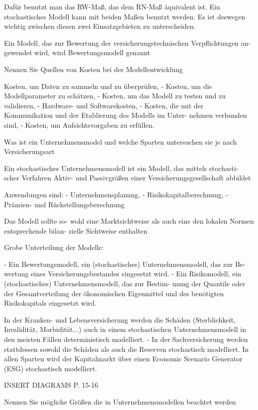 Dafür benutzt man das RW-Maß, das dem RN-Maß
äquivalent ist. Ein stochastisches Modell kann mit beiden Maßen benutzt werden.
Es ist deswegen wichtig zwischen diesen zwei Einsatzgebieten zu unterscheiden.


Ein Modell, das zur Bewertung der versicherungstechnischen Verpflichtungen an-
gewendet wird, wird Bewertungsmodell genannt




Nennen Sie Quellen von Kosten bei der Modellentwicklung 

Kosten, um Daten zu sammeln und zu überprüfen,
- Kosten, um die Modellparameter zu schätzen,
- Kosten, um das Modell zu testen und zu validieren,
- Hardware- und Softwarekosten,
- Kosten, die mit der Kommunikation und der Etablierung des Modells im Unter-
nehmen verbunden sind,
- Kosten, um Aufsichtsvorgaben zu erfüllen.




Was ist ein Unternehmensmodel und welche Sparten untersuchen sie je nach Versicherungsart


Ein stochastisches Unternehmensmodell ist ein Modell, das mittels stochasti-
scher Verfahren Aktiv- und Passivgrößen einer Versicherungsgesellschaft abbildet

Anwendungen sind:
- Unternehmensplanung,
- Risikokapitalberechnung,
- Prämien- und Rückstellungsberechnung

Das Modell sollte so-
wohl eine Marktsichtweise als auch eine den lokalen Normen entsprechende bilan-
zielle Sichtweise enthalten

Grobe Unterteilung der Modelle:

- Ein Bewertungsmodell, ein (stochastisches) Unternehmensmodell, das zur Be-
wertung eines Versicherungsbestandes eingesetzt wird.
- Ein Risikomodell, ein (stochastisches) Unternehmensmodell, das zur Bestim-
mung der Quantile oder der Gesamtverteilung der ökonomischen Eigenmittel
und des benötigten Risikokapitals eingesetzt wird.

In der Kranken- und Lebensversicherung werden die Schäden (Sterblichkeit,
Invalidität, Morbidität...) auch in einem stochastischen Unternehmensmodell
in den meisten Fällen deterministisch modelliert.
- In der Sachversicherung werden stattdessen sowohl die Schäden als auch die
Reserven stochastisch modelliert.
In allen Sparten wird der Kapitalmarkt über einen Economic Scenario Generator
(ESG) stochastisch modelliert.

INSERT DIAGRAMS P. 15-16


Nennen Sie mögliche Größen die in Unternehmensmodellen beachtet werden

